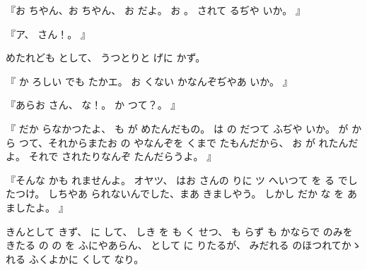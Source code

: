 『お
ちやん、お
ちやん、
お
だよ。
お
。
されて
るぢや
いか。
』

『ア、
さん！。
』

めたれども
として、
うつとりと
げに
かず。

『
か
ろしい
でも
たかエ。
お
くない
かなんぞぢやあ
いか。
』

『あらお
さん、
な！。
か
つて？。
』

『
だか
らなかつたよ、
も
が
めたんだもの。
は
の
だつて
ふぢや
いか。
が
から
つて、それからまたお
の
やなんぞを
くまで
たもんだから、
お
が
れたんだよ。
それで
されたりなんぞ
たんだらうよ。
』

『そんな
かも
れませんよ。
オヤツ、
はお
さんの
りに
ツ
へいつて
を
る
でしたつけ。
しちやあ
られないんでした、まあ
きましやう。
しかし
だか
な
を
あ
ましたよ。
』

きんとして
きず、
に
して、
しき
を
も
く
せつ、
も
らず
も
かならで
のみを
きたる
の
の
を
ふにやあらん、
として
に
りたるが、
みだれる
のほつれてかゝれる
ふくよかに
くして
なり。

